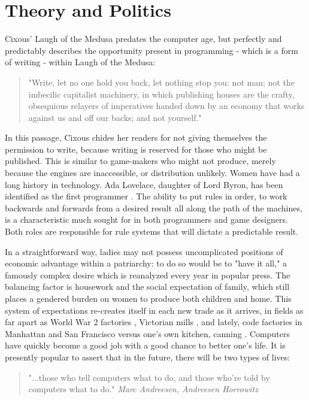 \section{Theory and Politics}
Cixous' Laugh of the Medusa predates the computer age, but perfectly and predictably describes the opportunity present in programming - which is a form of writing - within Laugh of the Medusa:
\begin{quote}
"Write, let no one hold you back, let nothing stop you: not man; not the imbecilic capitalist machinery, in which publishing houses are the crafty, obsequious relayers of imperatives handed down by an economy that works against us and off our backs; and not yourself." 
\textit{\parencite{cixous}}
\end{quote}

In this passage, Cixous chides her readers for not giving themselves the permission to write, because writing is reserved for those who might be published. This is similar to game-makers who might not produce, merely because the engines are inaccessible, or distribution unlikely. Women have had a long history in technology.
Ada Lovelace, daughter of Lord Byron, has been identified as the first programmer \parencite{plant}. The ability to put rules in order, to work backwards and forwards from a desired result all along the path of the machines, is a characteristic much sought for in both programmers and game designers. Both roles are responsible for rule systems that will dictate a predictable result.

In a straightforward way, ladies may not possess uncomplicated positions of economic advantage within a patriarchy: to do so would be to "have it all," a famously complex desire which is reanalyzed every year in popular press. The balancing factor is housework and the social expectation of family, which still places a gendered burden on women to produce both children and home. This system of expectations re-creates itself in each new trade as it arrives, in fields as far apart as World War 2 factories \parencite{summerfield}, Victorian mills \parencite{baskerville}, and lately, code factories in Manhattan and San Francisco versus one's own kitchen, canning \parencite{newdomestic}. Computers have quickly become a good job with a good chance to better one's life. It is presently popular to assert that in the future, there will be two types of lives:

\begin{quote}
"...those who tell computers what to do, and those who're told by computers what to do."
\textit{Marc Andreesen, Andreesen Horrowitz}
\end{quote}


